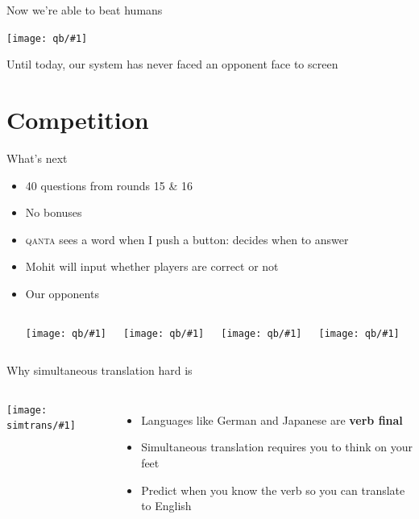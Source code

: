 \documentclass[compress]{beamer}
\newcommand{\gfxs}[2]{
\begin{center}
	\texttt{[image: simtrans/\#1]}
\end{center}
}
\newcommand{\gfxq}[2]{
\begin{center}
	\texttt{[image: qb/\#1]}
\end{center}
}
\begin{document}
\begin{frame}{Now we're able to beat humans}

  \gfxq{human_history}{1.0}
  \pause
  
 Until today, our system has never faced an opponent face to screen

\end{frame}


\section{Competition}

\begin{frame}{What's next}

	\begin{itemize}
		\item 40 questions from rounds 15 \& 16
		\item No bonuses
		\item \textsc{qanta} sees a word when I push a button: decides when to answer
		\item Mohit will input whether players are correct or not
		\pause
		\item Our opponents
		\begin{columns}
				\gfxq{colby_jeo}{1.0}
				\gfxq{ben_jeo}{1.0}
				\gfxq{alex_jeo}{1.0}
				\gfxq{kristin_jeo}{1.0}						
		\end{columns}
	\end{itemize}

\end{frame}


\begin{frame}{Why simultaneous translation hard is}

  \begin{columns}
       \gfxs{nuremberg_translators}{.9}
       \begin{itemize}
         \item Languages like German and Japanese are {\bf verb final}
         \item Simultaneous translation requires you to think on your feet
         \item Predict when you know the verb so you can translate to English
       \end{itemize}
  \end{columns}

\end{frame}
\end{document}
